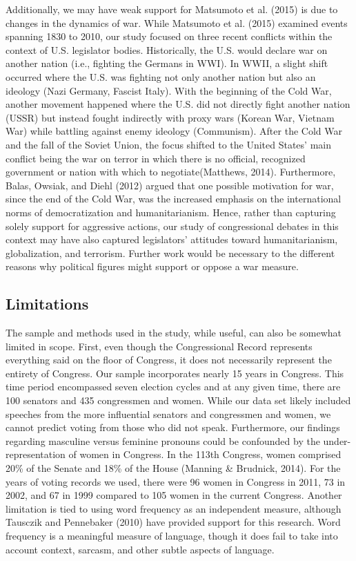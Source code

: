 \documentclass[english,,man]{apa6}
\begin{document}
Additionally, we may have weak support for Matsumoto et al. (2015) is due to changes in the dynamics of war. While Matsumoto et al. (2015) examined events spanning 1830 to 2010, our study focused on three recent conflicts within the context of U.S. legislator bodies. Historically, the U.S. would declare war on another nation (i.e., fighting the Germans in WWI). In WWII, a slight shift occurred where the U.S. was fighting not only another nation but also an ideology (Nazi Germany, Fascist Italy). With the beginning of the Cold War, another movement happened where the U.S. did not directly fight another nation (USSR) but instead fought indirectly with proxy wars (Korean War, Vietnam War) while battling against enemy ideology (Communism). After the Cold War and the fall of the Soviet Union, the focus shifted to the United States' main conflict being the war on terror in which there is no official, recognized government or nation with which to negotiate(Matthews, 2014). Furthermore, Balas, Owsiak, and Diehl (2012) argued that one possible motivation for war, since the end of the Cold War, was the increased emphasis on the international norms of democratization and humanitarianism. Hence, rather than capturing solely support for aggressive actions, our study of congressional debates in this context may have also captured legislators' attitudes toward humanitarianism, globalization, and terrorism. Further work would be necessary to the different reasons why political figures might support or oppose a war measure.

\hypertarget{limitations}{%
\subsection{Limitations}\label{limitations}}

The sample and methods used in the study, while useful, can also be somewhat limited in scope. First, even though the Congressional Record represents everything said on the floor of Congress, it does not necessarily represent the entirety of Congress. Our sample incorporates nearly 15 years in Congress. This time period encompassed seven election cycles and at any given time, there are 100 senators and 435 congressmen and women. While our data set likely included speeches from the more influential senators and congressmen and women, we cannot predict voting from those who did not speak. Furthermore, our findings regarding masculine versus feminine pronouns could be confounded by the under-representation of women in Congress. In the 113th Congress, women comprised 20\% of the Senate and 18\% of the House (Manning \& Brudnick, 2014). For the years of voting records we used, there were 96 women in Congress in 2011, 73 in 2002, and 67 in 1999 compared to 105 women in the current Congress. Another limitation is tied to using word frequency as an independent measure, although Tausczik and Pennebaker (2010) have provided support for this research. Word frequency is a meaningful measure of language, though it does fail to take into account context, sarcasm, and other subtle aspects of language.
\end{document}
